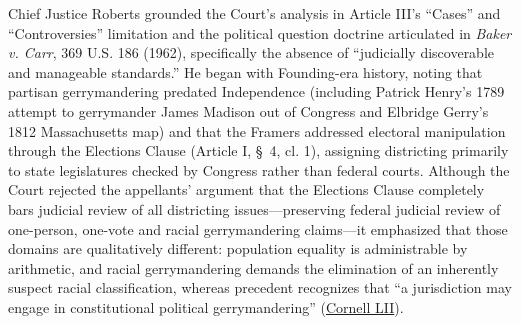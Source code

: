\documentclass[12pt]{article}
\begin{document}
Chief Justice Roberts grounded the Court's analysis in Article III's ``Cases'' and ``Controversies'' limitation and the political question doctrine articulated in \textit{Baker v. Carr}, 369 U.S. 186 (1962), specifically the absence of ``judicially discoverable and manageable standards.'' He began with Founding-era history, noting that partisan gerrymandering predated Independence (including Patrick Henry's 1789 attempt to gerrymander James Madison out of Congress and Elbridge Gerry's 1812 Massachusetts map) and that the Framers addressed electoral manipulation through the Elections Clause (Article I, \S~4, cl. 1), assigning districting primarily to state legislatures checked by Congress rather than federal courts. Although the Court rejected the appellants' argument that the Elections Clause completely bars judicial review of all districting issues---preserving federal judicial review of one-person, one-vote and racial gerrymandering claims---it emphasized that those domains are qualitatively different: population equality is administrable by arithmetic, and racial gerrymandering demands the elimination of an inherently suspect racial classification, whereas precedent recognizes that ``a jurisdiction may engage in constitutional political gerrymandering'' (\href{https://www.law.cornell.edu/supremecourt/text/18-422}{Cornell LII}).
\end{document}
